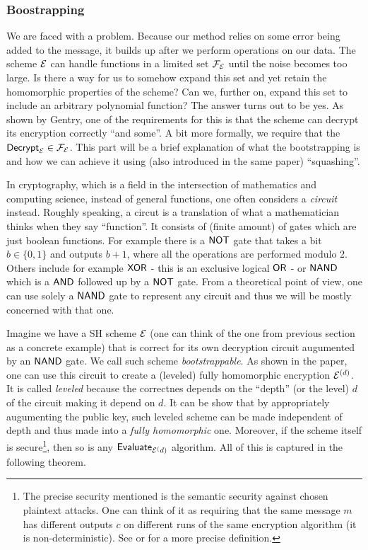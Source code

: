 \subsubsection{Boostrapping}
We are faced with a problem. Because our method relies on some error being added to the message, it builds up after we perform operations on our data. The scheme $\mathcal{E}$ can handle functions in a limited set $\mathcal{F}_{\mathcal{E}}$ until the noise becomes too large. Is there a way for us to somehow expand this set and yet retain the homomorphic properties of the scheme? Can we, further on, expand this set to include an arbitrary polynomial function? The answer turns out to be yes. As shown by Gentry, one of the requirements for this is that the scheme can decrypt its encryption correctly ``and some''. A bit more formally, we require that the $\textsf{Decrypt}_{\mathcal{E}} \in \mathcal{F}_{\mathcal{E}}$. This part will be a brief explanation of what the bootstrapping is and how we can achieve it using (also introduced in the same paper) ``squashing''.

\begin{remark}
  In cryptography, which is a field in the intersection of mathematics and computing science, instead of general functions, one often considers a \textit{circuit} instead. Roughly speaking, a circut is a translation of what a mathematician thinks when they say ``function''. It consists of (finite amount) of gates which are just boolean functions. For example there is a $\textsf{NOT}$ gate that takes a bit $b \in \{0,1\}$ and outputs $b + 1$, where all the operations are performed modulo 2. Others include for example $\textsf{XOR}$ - this is an exclusive logical $\textsf{OR}$ - or $\textsf{NAND}$ which is a $\textsf{AND}$ followed up by a $\textsf{NOT}$ gate. From a theoretical point of view, one can use solely a $\textsf{NAND}$ gate to represent any circuit and thus we will be mostly concerned with that one.
\end{remark}

Imagine we have a SH scheme $\mathcal{E}$ (one can think of the one from previous section as a concrete example) that is correct for its own decryption circuit augumented by an $\textsf{NAND}$ gate. We call such scheme \textit{bootstrappable}. As shown in the paper, one can use this circuit to create a (leveled) fully homomorphic encryption $\mathcal{E}^{(d)}$. It is called \textit{leveled} because the correctnes depends on the ``depth'' (or the level) $d$ of the circuit making it depend on $d$. It can be show that by appropriately augumenting the public key, such leveled scheme can be made independent of depth and thus made into a \textit{fully homomorphic} one. Moreover, if the scheme itself is secure\footnote{The precise security mentioned is the semantic security against chosen plaintext attacks. One can think of it as requiring that the same message $m$ has different outputs $c$ on different runs of the same encryption algorithm (it is non-deterministic). See \cite{katz} or \cite{lattice-survey} for a more precise definition.}, then so is any $\textsf{Evaluate}_{\mathcal{E}^(d)}$ algorithm. All of this is captured in the following theorem.

